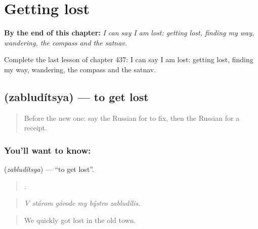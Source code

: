 
\chapter{Getting lost}
\label{ch:ru-getting-lost}

\begin{chapteropening}
\textbf{By the end of this chapter:} \emph{I can say I am lost: getting lost, finding my way, wandering, the compass and the satnav.}

Complete the last lesson of chapter 437: I can say I am lost: getting lost, finding my way, wandering, the compass and the satnav.
\end{chapteropening}

\section[\texorpdfstring{\ru{заблудиться} (zabludítsya)}{заблудиться (zabludítsya)}]{ (zabludítsya) — to get lost}

\label{lesson:RU-C437-zabluditsya}



\begin{quote}
Before the new one: say the Russian for to fix, then the Russian for a receipt.
\end{quote}

\subsection*{You'll want to know: }
\textbf{} (\emph{zabludítsya}) — \textquotedblleft{}to get lost\textquotedblright{}.

\begin{quote}
     .
\end{quote}

\begin{quote}
\emph{V stárom górode my býstro zabludílis.}
\end{quote}

\begin{quote}
We quickly got lost in the old town.
\end{quote}

